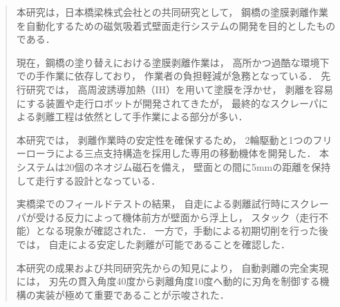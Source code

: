 ﻿\vspace*{20mm} %
\renewcommand{\abstractname}{\LARGE 要旨}
\begin{abstract}
  \vspace{5mm}
  本研究は，日本橋梁株式会社との共同研究として，
  鋼橋の塗膜剥離作業を自動化するための磁気吸着式壁面走行システムの開発を目的としたものである．

  現在，鋼橋の塗り替えにおける塗膜剥離作業は，
  高所かつ過酷な環境下での手作業に依存しており，
  作業者の負担軽減が急務となっている．
  先行研究では，
  高周波誘導加熱（IH）を用いて塗膜を浮かせ，
  剥離を容易にする装置や走行ロボットが開発されてきたが，
  最終的なスクレーパによる剥離工程は依然として手作業による部分が多い．

  本研究では，
  剥離作業時の安定性を確保するため，
  2輪駆動と1つのフリーローラによる三点支持構造を採用した専用の移動機体を開発した．
  本システムは20個のネオジム磁石を備え，
  壁面との間に5mmの距離を保持して走行する設計となっている．

  実橋梁でのフィールドテストの結果，
  自走による剥離試行時にスクレーパが受ける反力によって機体前方が壁面から浮上し，
  スタック（走行不能）となる現象が確認された．
  一方で，手動による初期切削を行った後では，
  自走による安定した剥離が可能であることを確認した．

  本研究の成果および共同研究先からの知見により，
  自動剥離の完全実現には，
  刃先の貫入角度40度から剥離角度10度へ動的に刃角を制御する機構の実装が極めて重要であることが示唆された．
\end{abstract}